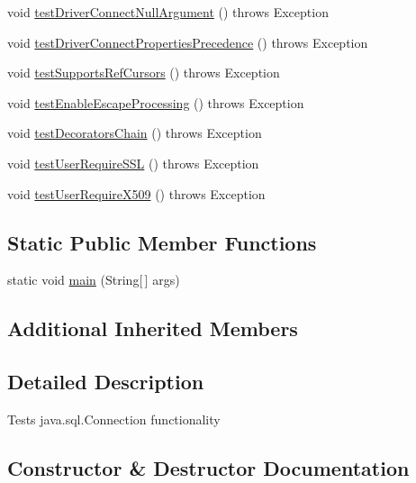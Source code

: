 \begin{DoxyCompactItemize}
\item 
void \mbox{\hyperlink{classtestsuite_1_1simple_1_1_connection_test_aafe08f45b914b4068e82456b8408401b}{test\+Driver\+Connect\+Null\+Argument}} ()  throws Exception 
\item 
void \mbox{\hyperlink{classtestsuite_1_1simple_1_1_connection_test_a92c8851ac00778b02dd81c2bb90d2d59}{test\+Driver\+Connect\+Properties\+Precedence}} ()  throws Exception 
\item 
void \mbox{\hyperlink{classtestsuite_1_1simple_1_1_connection_test_ad43851dc2d9601056a8fc521d543d6c1}{test\+Supports\+Ref\+Cursors}} ()  throws Exception 
\item 
void \mbox{\hyperlink{classtestsuite_1_1simple_1_1_connection_test_a64fec8e4893bf266e66b4f59ceeb323f}{test\+Enable\+Escape\+Processing}} ()  throws Exception 
\item 
void \mbox{\hyperlink{classtestsuite_1_1simple_1_1_connection_test_ac015cfb2b5173cb9e4af4d1bd3886c83}{test\+Decorators\+Chain}} ()  throws Exception 
\item 
void \mbox{\hyperlink{classtestsuite_1_1simple_1_1_connection_test_a0c148553019aa296f7f80dfc7edf1e49}{test\+User\+Require\+S\+SL}} ()  throws Exception 
\item 
void \mbox{\hyperlink{classtestsuite_1_1simple_1_1_connection_test_a8ccc3af85ebbc2d7b461b32b29d8982c}{test\+User\+Require\+X509}} ()  throws Exception 
\end{DoxyCompactItemize}
\subsection*{Static Public Member Functions}
\begin{DoxyCompactItemize}
\item 
static void \mbox{\hyperlink{classtestsuite_1_1simple_1_1_connection_test_a3f457b435e6cf75f31649400f2ce211d}{main}} (String\mbox{[}$\,$\mbox{]} args)
\end{DoxyCompactItemize}
\subsection*{Additional Inherited Members}


\subsection{Detailed Description}
Tests java.\+sql.\+Connection functionality 

\subsection{Constructor \& Destructor Documentation}
\mbox{\label{classtestsuite_1_1simple_1_1_connection_test_acee3750bd5fb78ce7006ff31f5740a48}} 
